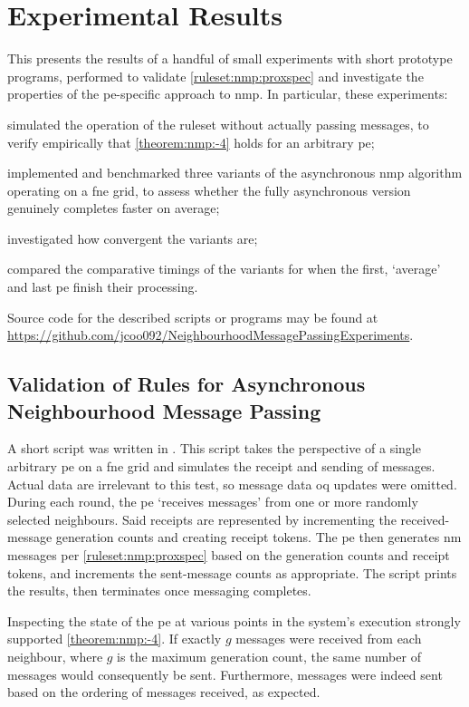 \section{\label{sec:nmp:experiments}Experimental Results}

This  presents the results of a handful of small experiments with short prototype programs, performed to validate \cref{ruleset:nmp:proxspec} and investigate the properties of the \gls{pe}-specific approach to \gls{nmp}.  In particular, these experiments:
\begin{inparaenum}[(i)]
\item simulated the operation of the \gls{ruleset} without actually passing messages, to verify empirically that \cref{theorem:nmp:-4} holds for an arbitrary \gls{pe};
\item implemented and benchmarked three variants of the asynchronous \gls{nmp} algorithm operating on a \gls{fne} grid, to assess whether the fully asynchronous version genuinely completes faster on average;
\item investigated how convergent the variants are;
\item compared the comparative timings of the variants for when the first, `average' and last \gls{pe} finish their processing.
\end{inparaenum}
Source code for the described scripts or programs may be found at \url{https://github.com/jcoo092/NeighbourhoodMessagePassingExperiments}.

\subsection{Validation of Rules for Asynchronous Neighbourhood Message Passing}
A short script was written in \fsharp{}.  This script takes the perspective of a single arbitrary \gls{pe} on a \gls{fne} grid and simulates the receipt and sending of messages.  Actual data are irrelevant to this test, so message data \gls{oq} updates were omitted.  During each round, the \gls{pe} `receives messages' from one or more randomly selected neighbours.  Said receipts are represented by incrementing the received-message generation counts and creating receipt tokens.  The \gls{pe} then generates \gls{nm} messages per \cref{ruleset:nmp:proxspec} based on the generation counts and receipt tokens, and increments the sent-message counts as appropriate.  The script prints the results, then terminates once messaging completes.

Inspecting the state of the \gls{pe} at various points in the system's execution strongly supported \cref{theorem:nmp:-4}.  If exactly \(g\) messages were received from each neighbour, where \(g\) is the maximum generation count, the same number of messages would consequently be sent.  Furthermore, messages were indeed sent based on the ordering of messages received, as expected.

